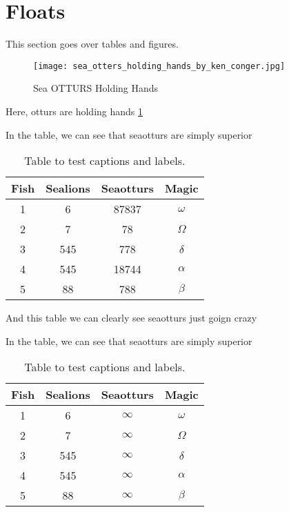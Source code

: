 \section{Floats}
This section goes over tables and figures.

\begin{figure}[H] %
	\centering
	\texttt{[image: sea\_otters\_holding\_hands\_by\_ken\_conger.jpg]}
	\caption{Sea OTTURS Holding Hands}
	\label{fig:sealion}
\end{figure}

Here, otturs are holding hands \ref{fig:sealion}

In the table, we can see that seaotturs are simply superior
\begin{table}[H]
	\centering
	\begin{tabular}{||c c c c||} 
		\hline
		Fish & Sealions & Seaotturs & Magic \\ [0.5ex] 
		\hline\hline
		1 & 6 & 87837 & $\omega$ \\ 
		2 & 7 & 78 & $\Omega$  \\
		3 & 545 & 778 & $\delta$  \\
		4 & 545 & 18744 & $\alpha$  \\
		5 & 88 & 788 & $\beta$  \\ [1ex] 
		\hline
	\end{tabular}
	\caption{Table to test captions and labels. \cite{Otturs2020}}
	\label{table:1}
\end{table}

And this table we can clearly see seaotturs just goign crazy

In the table, we can see that seaotturs are simply superior
\begin{table}[H]
	\centering
	\begin{tabular}{||c c c c||} 
		\hline
		Fish & Sealions & Seaotturs & Magic \\ [0.5ex] 
		\hline\hline
		1 & 6 & $\infty$ & $\omega$ \\ 
		2 & 7 & $\infty$ & $\Omega$  \\
		3 & 545 & $\infty$ & $\delta$  \\
		4 & 545 & $\infty$ & $\alpha$  \\
		5 & 88 & $\infty$ & $\beta$  \\ [1ex] 
		\hline
	\end{tabular}
	\caption{Table to test captions and labels. \cite{Otturs2020}}
	\label{table:2}
\end{table}

